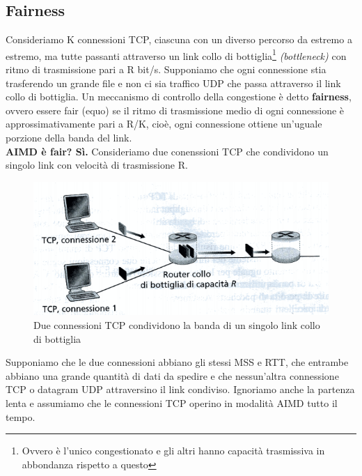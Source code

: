 \documentclass[11pt,a4paper]{book}
\begin{document}
\subsection{Fairness}
Consideriamo K connessioni TCP, ciascuna con un diverso percorso da estremo a estremo, ma tutte passanti attraverso un link collo di bottiglia\footnote{Ovvero è l'unico congestionato e gli altri hanno capacità trasmissiva in abbondanza rispetto a questo} \textit{(bottleneck)} con ritmo di trasmissione pari a R bit/s. Supponiamo che ogni connessione stia trasferendo un grande file e non ci sia traffico UDP che passa attraverso il link collo di bottiglia. Un meccanismo di controllo della congestione è detto \textbf{fairness}, ovvero essere fair (equo) se il ritmo di trasmissione medio di ogni connessione è approssimativamente pari a R/K, cioè, ogni connessione ottiene un'uguale porzione della banda del link. \\
\textbf{AIMD è fair? Sì.} Consideriamo due conenssioni TCP che condividono un singolo link con velocità di trasmissione R.
\begin{figure}
	\includegraphics[scale=0.6]{img/047.png}
	\caption{Due connessioni TCP condividono la banda di un singolo link collo di bottiglia}
\end{figure}
Supponiamo che le due connessioni abbiano gli stessi MSS e RTT, che entrambe abbiano una grande quantità di dati da spedire e che nessun'altra connessione TCP o datagram UDP attraversino il link condiviso. Ignoriamo anche la partenza lenta e assumiamo che le connessioni TCP operino in modalità AIMD tutto il tempo.
\end{document}
